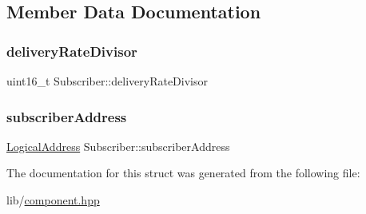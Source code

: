 \subsection{Member Data Documentation}
\mbox{\label{structSubscriber_a8221a4d1ba53e0407b27e44cda4a87ab}} 
\subsubsection{\texorpdfstring{delivery\+Rate\+Divisor}{deliveryRateDivisor}}
{\footnotesize\ttfamily uint16\+\_\+t Subscriber\+::delivery\+Rate\+Divisor}

\mbox{\label{structSubscriber_ad27b381f3d2a33920ff6664e4013abc3}} 
\subsubsection{\texorpdfstring{subscriber\+Address}{subscriberAddress}}
{\footnotesize\ttfamily \hyperlink{structLogicalAddress}{Logical\+Address} Subscriber\+::subscriber\+Address}



The documentation for this struct was generated from the following file\+:\begin{DoxyCompactItemize}
\item 
lib/\hyperlink{component_8hpp}{component.\+hpp}\end{DoxyCompactItemize}
